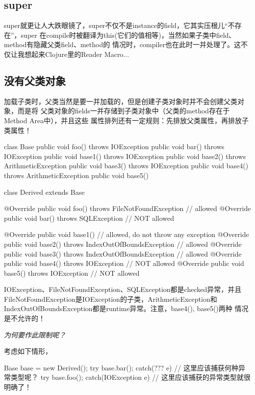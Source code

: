 \documentclass[a4paper,11pt]{article}
\begin{document}
\subsection[super]{super}
super就更让人大跌眼镜了，super不仅不是instance的field，它其实压根儿“不存在”，super
在compile时被翻译为this(它们的值相等)，当然如果子类中field、method有隐藏父类field、method的
情况时，compiler也在此时一并处理了。这不仅让我想起来Clojure里的Reader Macro...

\subsection[没有父类对象]{没有父类对象}
加载子类时，父类当然是要一并加载的，但是创建子类对象时并不会创建父类对象，而是将
父类对象的fields一并存储到子类对象中（父类的method存在于Method Area中），并且这些
属性排列还有一定规则：先排放父类属性，再排放子类属性！

\begin{javacode}
class Base {
  public void foo() throws IOException { }
  public void bar() throws IOException { }
  public void base1() throws IOException { }
  public void base2() throws ArithmeticException { }
  public void base3() throws IOException { }
  public void base4() throws ArithmeticException { }
  public void base5() { }
}

class Derived extends Base {
  @Override
  public void foo() throws FileNotFoundException { } // allowed
  @Override
  public void bar() throws SQLException { } // NOT allowed

  @Override
  public void base1() { } // allowed, do not throw any exception
  @Override
  public void base2() throws IndexOutOfBoundsException { } // allowed
  @Override
  public void base3() throws IndexOutOfBoundsException { } // allowed
  @Override
  public void base4() throws IOException { } // NOT allowed
  @Override
  public void base5() throws IOException { } // NOT allowed
}
\end{javacode}

IOException、FileNotFoundException、SQLException都是checked异常，并且
FileNotFound\-Exception是IOException的子类，ArithmeticException和
IndexOutOfBoundsException都是runtime异常。注意，base4(), base5()两种
情况是不允许的！

\emph{为何要作此限制呢？}

考虑如下情形，

\begin{javacode}
Base base = new Derived();
try {
  base.bar();
} catch(??? e) {
  // 这里应该捕获何种异常类型呢？
}
try {
  base.foo();
} catch(IOException e) {
  // 这里应该捕获的异常类型就很明确了！
}
\end{javacode}
\end{document}
